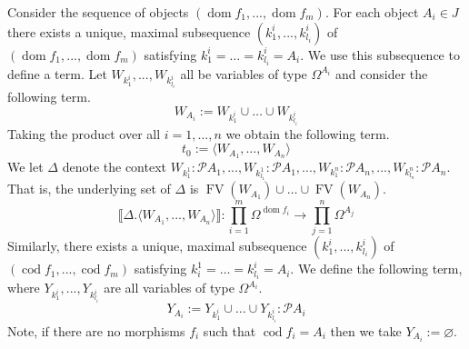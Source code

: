 \documentclass{tac}
\newcommand{\call}[1]{\mathcal{#1}}
\newcommand{\lto}{\longrightarrow}
\begin{document}
	Consider the sequence of objects $(\operatorname{dom}f_1,...,\operatorname{dom}f_m)$. For each object $A_i \in J$ there exists a unique, maximal subsequence $(k^i_1,...,k^i_{l_i})$ of $(\operatorname{dom}f_1,...,\operatorname{dom}f_m)$ satisfying $k^i_1 = \hdots = k^i_{l_i} = A_i$. We use this subsequence to define a term. Let $W_{k_1^i},...,W_{k_{l_i}^i}$ all be variables of type $\Omega^{A_i}$ and consider the following term.
	\begin{equation}
		W_{A_i} := W_{k_1^i} \cup \hdots \cup W_{k_{l_i}^i}
	\end{equation}
	Taking the product over all $i = 1,...,n$ we obtain the following term.
	\begin{equation}
		t_0 := \langle W_{A_1}, \hdots, W_{A_n}\rangle
	\end{equation}
	We let $\Delta$ denote the context $W_{k_1^1}:\call{P}A_1,...,W_{k_{l_1}^1}:\call{P}A_1,...,W_{k_1^n}:\call{P}A_n,...,W_{k_{l_n}^n}:\call{P}A_n$. That is, the underlying set of $\Delta$ is $\operatorname{FV}(W_{A_1}) \cup \hdots \cup \operatorname{FV}(W_{A_n})$.
	\begin{equation}\label{eq:compression}
		\llbracket \Delta. \langle W_{A_1},...,W_{A_n}\rangle \rrbracket: \prod_{i = 1}^m \Omega^{\operatorname{dom}f_i} \lto \prod_{j = 1}^n \Omega^{A_j}
	\end{equation}
	Similarly, there exists a unique, maximal subsequence $(k_1^i,...,k_{l_i}^i)$ of $(\operatorname{cod}f_1,...,\operatorname{cod}f_m)$ satisfying $k_i^1 = \hdots = k_{l_i}^i = A_i$. We define the following term, where $Y_{k_1^i},...,Y_{k_{l_i}^i}$ are all variables of type $\Omega^{A_i}$.
	\begin{equation}
		Y_{A_i} := Y_{k_1^i} \cup \hdots \cup Y_{k_{l_i}^i}: \call{P}A_i
	\end{equation}
	Note, if there are no morphisms $f_i$ such that $\operatorname{cod}f_i = A_i$ then we take $Y_{A_i} := \varnothing$.
	
\end{document}
